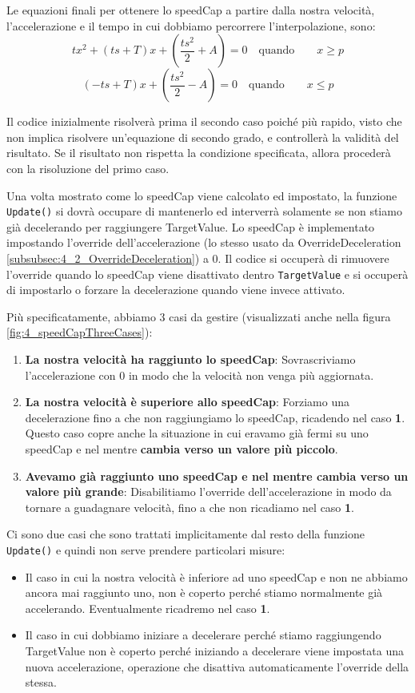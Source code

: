 \documentclass[main.tex]{subfiles}
\begin{document}
Le equazioni finali per ottenere lo speedCap a partire dalla nostra velocità, l'accelerazione e il tempo in cui dobbiamo percorrere l'interpolazione, sono:
\[tx^2 + (ts + T)x + (\frac{ts^2}{2} + A) = 0 \quad\text{quando}\qquad x \geq p\]
\[(-ts + T)x + (\frac{ts^2}{2} - A) = 0 \quad\text{quando}\qquad x \leq p\]

Il codice inizialmente risolverà prima il secondo caso poiché più rapido, visto che non implica risolvere un'equazione di secondo grado, e controllerà la validità del risultato. Se il risultato non rispetta la condizione specificata, allora procederà con la risoluzione del primo caso. \newline

Una volta mostrato come lo speedCap viene calcolato ed impostato, la funzione \lstinline{Update()} si dovrà occupare di mantenerlo ed interverrà solamente se non stiamo già decelerando per raggiungere TargetValue. Lo speedCap è implementato impostando l'override dell'accelerazione (lo stesso usato da OverrideDeceleration \ref{subsubsec:4_2_OverrideDeceleration}) a 0. Il codice si occuperà di rimuovere l'override quando lo speedCap viene disattivato dentro \lstinline{TargetValue} e si occuperà di impostarlo o forzare la decelerazione quando viene invece attivato.

\noindent Più specificatamente, abbiamo 3 casi da gestire (visualizzati anche nella figura \ref{fig:4_speedCapThreeCases}):
\begin{enumerate}
    \item \textbf{La nostra velocità ha raggiunto lo speedCap}: Sovrascriviamo l'accelerazione con 0 in modo che la velocità non venga più aggiornata.
    \item \textbf{La nostra velocità è superiore allo speedCap}: Forziamo una decelerazione fino a che non raggiungiamo lo speedCap, ricadendo nel caso \textbf{1}. Questo caso copre anche la situazione in cui eravamo già fermi su uno speedCap e nel mentre \textbf{cambia verso un valore più piccolo}.
    \item \textbf{Avevamo già raggiunto uno speedCap e nel mentre cambia verso un valore più grande}: Disabilitiamo l'override dell'accelerazione in modo da tornare a guadagnare velocità, fino a che non ricadiamo nel caso \textbf{1}.
\end{enumerate}

Ci sono due casi che sono trattati implicitamente dal resto della funzione \lstinline{Update()} e quindi non serve prendere particolari misure:
\begin{itemize}
    \item Il caso in cui la nostra velocità è inferiore ad uno speedCap e non ne abbiamo ancora mai raggiunto uno, non è coperto perché stiamo normalmente già accelerando. Eventualmente ricadremo nel caso \textbf{1}.
    \item Il caso in cui dobbiamo iniziare a decelerare perché stiamo raggiungendo TargetValue non è coperto perché iniziando a decelerare viene impostata una nuova accelerazione, operazione che disattiva automaticamente l'override della stessa.
\end{itemize}
\end{document}
